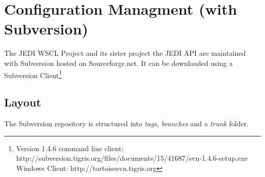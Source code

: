 \documentclass[a4paper,oneside,10pt]{article}
\begin{document}
\section{Configuration Managment (with Subversion)}
The JEDI WSCL Project and its sister project the JEDI API are maintained with Subversion hosted on Sourceforge.net.
It can be downloaded using a Subversion Client\footnote{Version 1.4.6 command line client: http://subversion.tigris.org/files/documents/15/41687/svn-1.4.6-setup.exe\\Windows Client: http://tortoisesvn.tigris.org}

\subsection{Layout}
The Subversion repository is structured into \textit{tags}, \textit{branches} and a \textit{trunk} folder.
\end{document}

